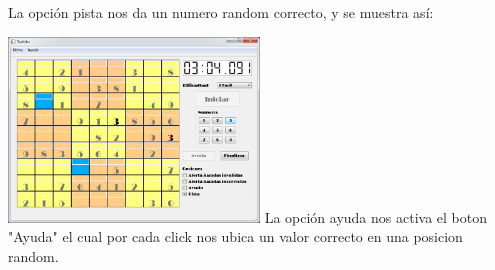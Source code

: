 \documentclass[12pt,oneside]{book}
\begin{document}
\begin{center}
	La opción pista nos da un numero random correcto, y se muestra así:

	\includegraphics[width=0.5\textwidth]{./imagenes/pista_juego.png}  
	La opción ayuda nos activa el boton "Ayuda" el cual por cada click nos ubica un valor correcto en una posicion random.
	
\end{center}	

	
\end{document}
